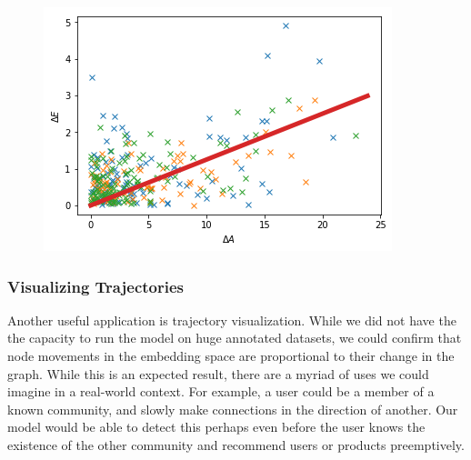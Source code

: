 \documentclass[12pt,twoside]{report}
\begin{document}
\begin{figure}[H]
\begin{center}
\begin{minipage}{0.8\linewidth}
\includegraphics[width=\linewidth]{figures/emb_change.png}
\end{minipage}%
\end{center}
\end{figure}

\subsubsection{Visualizing Trajectories}

Another useful application is trajectory visualization. While we did not have the the capacity to run the model on huge annotated datasets, we could confirm that node movements in the embedding space are proportional to their change in the graph. While this is an expected result, there are a myriad of uses we could imagine in a real-world context. For example, a user could be a member of a known community, and slowly make connections in the direction of another. Our model would be able to detect this perhaps even before the user knows the existence of the other community and recommend users or products preemptively. \\
\end{document}
